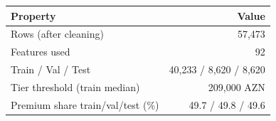 \begin{tabular}{@{}lr@{}}
\toprule
Property & Value \\
\midrule
Rows (after cleaning) & 57,473 \\
Features used & 92 \\
Train / Val / Test & 40,233 / 8,620 / 8,620 \\
Tier threshold (train median) & 209,000 AZN \\
Premium share train/val/test (\%) & 49.7 / 49.8 / 49.6 \\
\bottomrule
\end{tabular}
